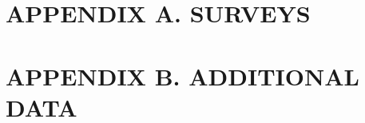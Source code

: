 
%

\chapter{APPENDIX A. SURVEYS}\label{appendix:surveys}


\chapter{APPENDIX B. ADDITIONAL DATA}\label{appendix:data}

